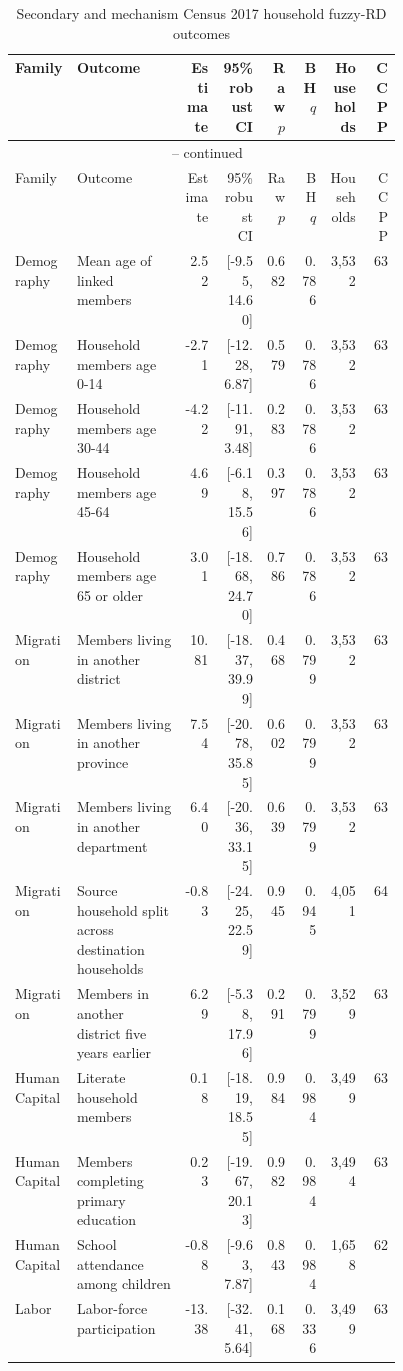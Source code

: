 \begingroup
\scriptsize
\begin{longtable}{p{0.16\linewidth}p{0.29\linewidth}rrrrrr}
\caption{Secondary and mechanism Census 2017 household fuzzy-RD outcomes}
\label{tab:rd_outcomes_secondary_2017_household} \\
\toprule
Family & Outcome & Estimate & 95\% robust CI & Raw \(p\) & BH \(q\) & Households & CCPP \\
\midrule
\endfirsthead
\multicolumn{8}{c}{\tablename\ \thetable{} -- continued} \\
\toprule
Family & Outcome & Estimate & 95\% robust CI & Raw \(p\) & BH \(q\) & Households & CCPP \\
\midrule
\endhead
Demography & Mean age of linked members & 2.52 & [-9.55, 14.60] & 0.682 & 0.786 & 3,532 & 63 \\
Demography & Household members age 0-14 & -2.71 & [-12.28, 6.87] & 0.579 & 0.786 & 3,532 & 63 \\
Demography & Household members age 30-44 & -4.22 & [-11.91, 3.48] & 0.283 & 0.786 & 3,532 & 63 \\
Demography & Household members age 45-64 & 4.69 & [-6.18, 15.56] & 0.397 & 0.786 & 3,532 & 63 \\
Demography & Household members age 65 or older & 3.01 & [-18.68, 24.70] & 0.786 & 0.786 & 3,532 & 63 \\
Migration & Members living in another district & 10.81 & [-18.37, 39.99] & 0.468 & 0.799 & 3,532 & 63 \\
Migration & Members living in another province & 7.54 & [-20.78, 35.85] & 0.602 & 0.799 & 3,532 & 63 \\
Migration & Members living in another department & 6.40 & [-20.36, 33.15] & 0.639 & 0.799 & 3,532 & 63 \\
Migration & Source household split across destination households & -0.83 & [-24.25, 22.59] & 0.945 & 0.945 & 4,051 & 64 \\
Migration & Members in another district five years earlier & 6.29 & [-5.38, 17.96] & 0.291 & 0.799 & 3,529 & 63 \\
Human Capital & Literate household members & 0.18 & [-18.19, 18.55] & 0.984 & 0.984 & 3,499 & 63 \\
Human Capital & Members completing primary education & 0.23 & [-19.67, 20.13] & 0.982 & 0.984 & 3,494 & 63 \\
Human Capital & School attendance among children & -0.88 & [-9.63, 7.87] & 0.843 & 0.984 & 1,658 & 62 \\
Labor & Labor-force participation & -13.38 & [-32.41, 5.64] & 0.168 & 0.336 & 3,499 & 63 \\

\end{longtable}
